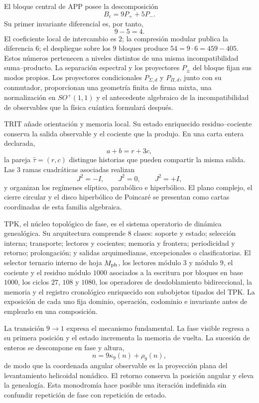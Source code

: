 El bloque central de APP posee la descomposición
\[
 B_c=9P_++5P_-.
\]
Su primer invariante diferencial es, por tanto,
\[
 \boxed{9-5=4}.
\]
El coeficiente local de intercambio es \(2\); la compresión modular publica
la diferencia \(6\); el despliegue sobre los \(9\) bloques produce
\(54=9\cdot6=459-405\). Estos números pertenecen a niveles distintos de una
misma incompatibilidad suma--producto. La separación espectral y los
proyectores \(P_\pm\) del bloque fijan sus modos propios. Los proyectores
condicionales \(P_{\Sigma,d}\) y \(P_{\Pi,d}\), junto con su conmutador,
proporcionan una geometría finita de firma mixta,
una normalización en \(SO^+(1,1)\) y el antecedente algebraico de la
incompatibilidad de observables que la física cuántica formulará después.

TRIT añade orientación y memoria local. Su estado enriquecido
residuo--cociente conserva la salida observable y el cociente que la produjo.
En una carta entera declarada,
\[
 a+b=r+3c,
\]
la pareja \(\widehat\tau=(r,c)\) distingue historias que pueden compartir la
misma salida. Las \(3\) ramas cuadráticas asociadas realizan
\[
 J^2=-I,\qquad J^2=0,\qquad J^2=+I,
\]
y organizan los regímenes elíptico, parabólico e hiperbólico. El plano
complejo, el cierre circular y el disco hiperbólico de Poincaré se presentan
como cartas coordinadas de esta familia algebraica.

TPK, el núcleo topológico de fase, es el sistema operatorio de dinámica
genealógica. Su arquitectura comprende \(8\) clases: soporte y estado; selección interna;
transporte; lectores y cocientes; memoria y frontera; periodicidad y retorno;
prolongación; y salidas arquimedianas, excepcionales o clasificatorias.
El selector ternario interno de hoja \(M_{\rm ph}\), los
lectores módulo \(3\) y módulo \(9\), el cociente y el residuo módulo
\(1000\) asociados a la escritura por bloques en base \(1000\), los ciclos
\(27\), \(108\) y \(1080\), los operadores de desdoblamiento bidireccional,
la memoria y el registro cronológico enriquecido son subobjetos tipados del
TPK. La exposición de cada uno fija dominio, operación, codominio e
invariante antes de emplearlo en una composición.

La transición \(9\to1\) expresa el mecanismo fundamental. La fase visible
regresa a su primera posición y el estado incrementa la memoria de vuelta.
La sucesión de enteros se descompone en fase y altura,
\[
 n=9\kappa_9(n)+\rho_9(n),
\]
de modo que la coordenada angular observable es la proyección plana del
levantamiento helicoidal nonádico. El
retorno conserva la posición angular y eleva la genealogía. Esta monodromía
hace posible una iteración indefinida sin confundir repetición de fase con
repetición de estado.

